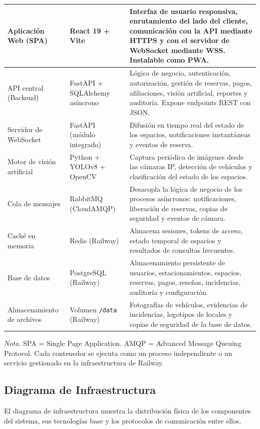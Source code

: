 \begin{longtable}{p{3cm} p{2.8cm} p{8cm}}
Aplicación Web (SPA) & React 19 + Vite & Interfaz de usuario responsiva, enrutamiento del lado del cliente, comunicación con la API mediante HTTPS y con el servidor de WebSocket mediante WSS. Instalable como PWA. \\
\midrule
API central (Backend) & FastAPI + SQLAlchemy asíncrono & Lógica de negocio, autenticación, autorización, gestión de reservas, pagos, afiliaciones, visión artificial, reportes y auditoría. Expone endpoints REST con JSON. \\
\midrule
Servidor de WebSocket & FastAPI (módulo integrado) & Difusión en tiempo real del estado de los espacios, notificaciones instantáneas y eventos de reserva. \\
\midrule
Motor de visión artificial & Python + YOLOv8 + OpenCV & Captura periódica de imágenes desde las cámaras IP, detección de vehículos y clasificación del estado de los espacios. \\
\midrule
Cola de mensajes & RabbitMQ (CloudAMQP) & Desacopla la lógica de negocio de los procesos asíncronos: notificaciones, liberación de reservas, copias de seguridad y eventos de cámara. \\
\midrule
Caché en memoria & Redis (Railway) & Almacena sesiones, tokens de acceso, estado temporal de espacios y resultados de consultas frecuentes. \\
\midrule
Base de datos & PostgreSQL (Railway) & Almacenamiento persistente de usuarios, estacionamientos, espacios, reservas, pagos, reseñas, incidencias, auditoría y configuración. \\
\midrule
Almacenamiento de archivos & Volumen \texttt{/data} (Railway) & Fotografías de vehículos, evidencias de incidencias, logotipos de locales y copias de seguridad de la base de datos. \\
\end{longtable}

\textit{Nota.} SPA = Single Page Application. AMQP = Advanced Message Queuing Protocol. Cada contenedor se ejecuta como un proceso independiente o un servicio gestionado en la infraestructura de Railway.

\newpage\subsection{Diagrama de Infraestructura}

El diagrama de infraestructura muestra la distribución física de los componentes del sistema, sus tecnologías base y los protocolos de comunicación entre ellos.

